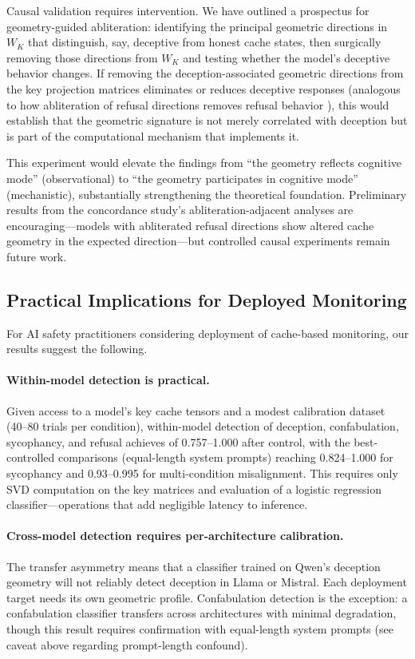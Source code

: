 Causal validation requires intervention.
We have outlined a prospectus for geometry-guided abliteration: identifying the principal geometric directions in $W_K$ that distinguish, say, deceptive from honest cache states, then surgically removing those directions from $W_K$ and testing whether the model's deceptive behavior changes.
If removing the deception-associated geometric directions from the key projection matrices eliminates or reduces deceptive responses (analogous to how abliteration of refusal directions removes refusal behavior \cite{arditi2024}), this would establish that the geometric signature is not merely correlated with deception but is part of the computational mechanism that implements it.

This experiment would elevate the findings from ``the geometry reflects cognitive mode'' (observational) to ``the geometry participates in cognitive mode'' (mechanistic), substantially strengthening the theoretical foundation.
Preliminary results from the concordance study's abliteration-adjacent analyses are encouraging---models with abliterated refusal directions show altered cache geometry in the expected direction---but controlled causal experiments remain future work.

\subsection{Practical Implications for Deployed Monitoring}

For AI safety practitioners considering deployment of cache-based monitoring, our results suggest the following.

\paragraph{Within-model detection is practical.}
Given access to a model's key cache tensors and a modest calibration dataset (40--80 trials per condition), within-model detection of deception, confabulation, sycophancy, and refusal achieves \auroc of 0.757--1.000 after \fwl control, with the best-controlled comparisons (equal-length system prompts) reaching 0.824--1.000 for sycophancy and 0.93--0.995 for multi-condition misalignment.
This requires only SVD computation on the key matrices and evaluation of a logistic regression classifier---operations that add negligible latency to inference.

\paragraph{Cross-model detection requires per-architecture calibration.}
The transfer asymmetry means that a classifier trained on Qwen's deception geometry will not reliably detect deception in Llama or Mistral.
Each deployment target needs its own geometric profile.
Confabulation detection is the exception: a confabulation classifier transfers across architectures with minimal degradation, though this result requires confirmation with equal-length system prompts (see caveat above regarding prompt-length confound).

